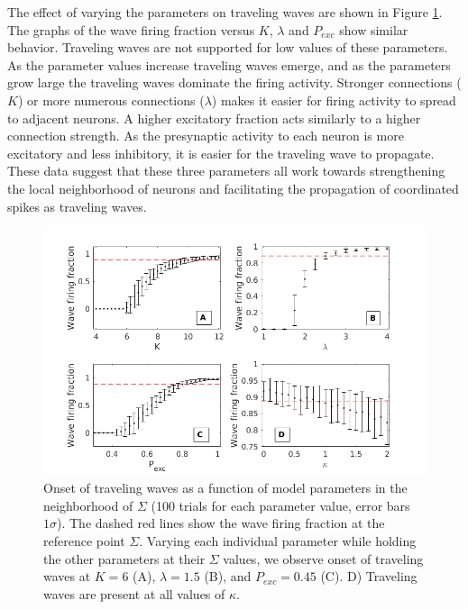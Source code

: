 The effect of varying the parameters on traveling waves are shown in Figure \ref{fig:wave_parameters}.
The graphs of the wave firing fraction versus $K$, $\lambda$ and $P_{exc}$ show similar behavior.
Traveling waves are not supported for low values of these parameters.
As the parameter values increase traveling waves emerge, and as the parameters grow large the traveling waves dominate the firing activity.
Stronger connections ($K$) or more numerous connections ($\lambda$) makes it easier for firing activity to spread to adjacent neurons.
A higher excitatory fraction acts similarly to a higher connection strength. 
As the presynaptic activity to each neuron is more excitatory and less inhibitory, it is easier for the traveling wave to propagate.
These data suggest that these three parameters all work towards strengthening the local neighborhood of neurons and facilitating the propagation of coordinated spikes as traveling waves.

\begin{figure}[!htb]
 \centering
 \includegraphics[width=\textwidth]{fig/ParamWaveSim}
 \caption{Onset of traveling waves as a function of model parameters in the neighborhood of $\Sigma$ (100 trials for each parameter value, error bars $1\sigma$). 
         The dashed red lines show the wave firing fraction at the reference  point $\Sigma$.  
         Varying each individual parameter while holding the other parameters at their $\Sigma$ values, we observe onset of traveling waves at $K=6$ (A), $\lambda=1.5$ (B), and $P_{exc}=0.45$ (C).  
         D) Traveling waves are present at all values of $\kappa$. }
 \label{fig:wave_parameters}
\end{figure}

\FloatBarrier

